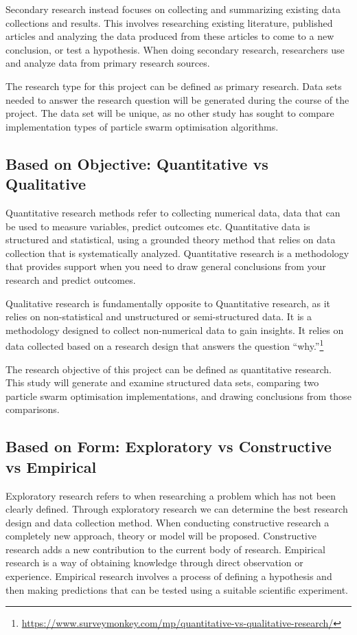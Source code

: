 \documentclass[oneside,12pt]{book}
\begin{document}
Secondary research instead focuses on collecting and summarizing existing data collections and results. This involves researching existing literature, published articles and analyzing the data produced from these articles to come to a new conclusion, or test a hypothesis. When doing secondary research, researchers use and analyze data from primary research sources.\cite{bouchrika_2020}

The research type for this project can be defined as primary research. Data sets needed to answer the research question will be generated during the course of the project. The data set will be unique, as no other study has sought to compare implementation types of particle swarm optimisation algorithms. 

\subsection{Based on Objective: Quantitative vs Qualitative}
Quantitative research methods refer to collecting numerical data, data that can be used to measure variables, predict outcomes etc. Quantitative data is structured and statistical, using a grounded theory method that relies on data collection that is systematically analyzed. Quantitative research is a methodology that provides support when you need to draw general conclusions from your research and predict outcomes.\cite{mcleod_2019}

Qualitative research is fundamentally opposite to Quantitative research, as it relies on non-statistical and unstructured or semi-structured data. It is a methodology designed to collect non-numerical data to gain insights. It relies on data collected based on a research design that answers the question “why.”\footnote{\url{https://www.surveymonkey.com/mp/quantitative-vs-qualitative-research/}}

The research objective of this project can be defined as quantitative research. This study will generate and examine structured data sets, comparing two particle swarm optimisation implementations, and drawing conclusions from those comparisons. 
\subsection{Based on Form: Exploratory vs Constructive vs Empirical}
Exploratory research refers to when researching a problem which has not been clearly defined. Through exploratory research we can determine the best research design and data collection method. 
When conducting constructive research a completely new approach, theory or model will be proposed. Constructive research adds a new contribution to the current body of research. 
Empirical research is a way of obtaining knowledge through direct observation or experience. Empirical research involves a process of defining a hypothesis and then making predictions that can be tested using a suitable scientific experiment. 
\end{document}
